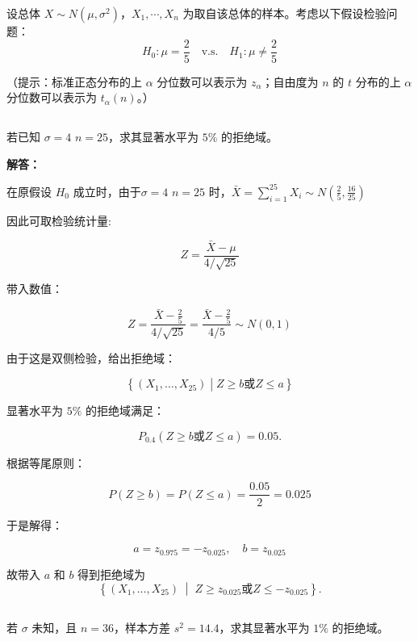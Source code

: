 \documentclass[12pt,a4paper]{article}
\begin{document}
设总体 $X \sim N(\mu,\sigma^2)$，$X_1,\cdots,X_n$ 为取自该总体的样本。考虑以下假设检验问题：
\[
H_0: \mu = \frac{2}{5} \quad \text{v.s.} \quad H_1: \mu \neq \frac{2}{5}
\]

（提示：标准正态分布的上 $\alpha$ 分位数可以表示为 $z_\alpha$；自由度为 $n$ 的 $t$ 分布的上 $\alpha$ 分位数可以表示为 $t_\alpha(n)$。）

\subsection{}

若已知 $\sigma = 4$  $n=25$，求其显著水平为 $5\%$ 的拒绝域。

\begin{answerbox}
\textbf{解答：}

在原假设 $H_0$ 成立时，由于$\sigma = 4$  $n=25$ 时，$\bar{X} = \sum_{i=1}^{25} X_i \sim N\left(\frac{2}{5}, \frac{16}{25}\right)$

因此可取检验统计量:

$$
Z=\frac{\bar X-\mu}{4/\sqrt{25}}
$$

带入数值：

$$
Z=\frac{\bar X-\frac25}{4/\sqrt{25}}=\frac{\bar X-\frac25}{4/5} \sim N(0,1)
$$

由于这是双侧检验，给出拒绝域：

$$
\left\{(X_1, \ldots, X_{25}) \middle| Z \geq b \text{或} Z \leq a \right\}
$$

显著水平为 $5\%$ 的拒绝域满足：

\[
P_{0.4}(Z \geq b \text{或} Z \leq a)=0.05.
\]

根据等尾原则：

$$
P\left(Z \geq b\right) = P\left(Z \leq a\right) = \frac{0.05}{2} = 0.025
$$

于是解得：

$$
a = z_{0.975} = -z_{0.025}, \quad b = z_{0.025}
$$

故带入 $a$ 和 $b$ 得到拒绝域为
\[
\left\{
(X_1,\dots,X_{25})\;\middle|\;
Z \geq z_{0.025} \text{或} Z \leq -z_{0.025}
\right\}.
\]

\end{answerbox}


\subsection{}

若 $\sigma$ 未知，且 $n=36$，样本方差 $s^2 = 14.4$，求其显著水平为 $1\%$ 的拒绝域。
\end{document}
